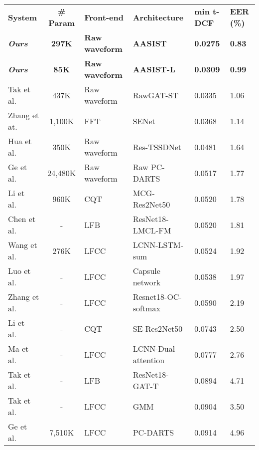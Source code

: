 \documentclass{article}
\begin{document}
\begin{table*}[!t]
  \centering
   \setlength\tabcolsep{5pt}
  \begin{tabularx}{\linewidth}{lcYYYY}
    \Xhline{1pt}
	\textbf{System} & \textbf{\# Param} & \textbf{Front-end} & \textbf{Architecture} & \textbf{min t-DCF} & \textbf{EER (\%)}	\\ 
    \Xhline{1pt}
	\textbf{{\em Ours}} &\textbf{ 297K }& \textbf{Raw waveform} & \textbf{AASIST} & \textbf{0.0275} & \textbf{0.83}\\
	\hline
	\textbf{{\em Ours}} & \textbf{85K} & \textbf{Raw waveform }& \textbf{AASIST-L} & \textbf{0.0309} & \textbf{0.99}\\
	\hline
	 Tak et al.~\cite{tak2021end} & 437K & Raw waveform & RawGAT-ST & 0.0335 & 1.06\\
	 \hline
	 Zhang et at.~\cite{zhang2021effect}&1,100K&FFT&SENet&0.0368& 1.14\\
	 \hline
	 Hua et al.~\cite{hua2021towards}&350K&Raw waveform&Res-TSSDNet&0.0481&1.64\\ 
	 \hline	
	 Ge et al.~\cite{ge2021raw}&24,480K&Raw waveform &Raw PC-DARTS& 0.0517&1.77\\
	 \hline
	 Li et al.~\cite{li2021channelwise}& 960K & CQT &MCG-Res2Net50 & 0.0520&1.78\\
	  \hline	
	 Chen et al.~\cite{chen2020generalization}&-&LFB&ResNet18-LMCL-FM&0.0520&1.81\\
	 \hline
	Wang et al.~\cite{wang21fa_interspeech}&276K&LFCC&LCNN-LSTM-sum&0.0524&1.92\\  
	 \hline	
	Luo et al.~\cite{luo2021capsule}&-&LFCC&Capsule network&0.0538&1.97\\  
	\hline
	Zhang et al.~\cite{zhang2021one}&-&LFCC&Resnet18-OC-softmax&0.0590&2.19\\
	\hline
	Li et al.~\cite{li2021replay}&-&CQT&SE-Res2Net50&0.0743&2.50\\
	\hline
	Ma et al.~\cite{ma2021improved}&-&LFCC&LCNN-Dual attention&0.0777&2.76\\
	\hline
	Tak et al.~\cite{tak2021graph}&-&LFB&ResNet18-GAT-T&0.0894&4.71\\
	\hline
    Tak et al.~\cite{tak2020spoofing}&-&LFCC&GMM&0.0904 &3.50\\
	\hline
	Ge et al.~\cite{ge2021}&7,510K&LFCC& PC-DARTS& 0.0914&4.96\\



\end{tabularx}
\end{table*}
\end{document}
